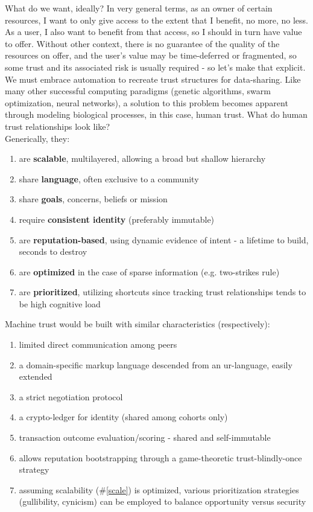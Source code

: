 \documentclass[10pt, twoside]{article}
\begin{document}
What do we want, ideally? In very general terms, as an owner of certain resources, I want to only give access to the extent that I benefit, no more, no less. As a user, I also want to benefit from that access, so I should in turn have value to offer. Without other context, there is no guarantee of the quality of the resources on offer, and the user's value may be time-deferred or fragmented, so some trust and its associated risk is usually required - so let's make that explicit. We must embrace automation to recreate trust structures for data-sharing. Like many other successful computing paradigms (genetic algorithms, swarm optimization, neural networks), a solution to this problem becomes apparent through modeling biological processes, in this case, human trust. What do human trust relationships look like? 
\\Generically, they:
\begin{enumerate}
	\item are \textbf{scalable}, multilayered, allowing a broad but shallow hierarchy \label{scale}
	\item share \textbf{language}, often exclusive to a community \label{language}
	\item share \textbf{goals}, concerns, beliefs or mission \label{mission}
	\item require \textbf{consistent identity} (preferably immutable) \label{identity}
	\item are \textbf{reputation-based}, using dynamic evidence of intent - a lifetime to build, seconds to destroy \label{reputation}
	\item are \textbf{optimized} in the case of sparse information (e.g. two-strikes rule) \label{optimized}
	\item are \textbf{prioritized}, utilizing shortcuts since tracking trust relationships tends to be high cognitive load \label{priorities}
\end{enumerate}
Machine trust would be built with similar characteristics (respectively):
\begin{enumerate}
	\item limited direct communication among peers
	\item a domain-specific markup language descended from an ur-language, easily extended
	\item a strict negotiation protocol
	\item a crypto-ledger for identity (shared among cohorts only)
	\item transaction outcome evaluation/scoring - shared and self-immutable
	\item allows reputation bootstrapping through a game-theoretic trust-blindly-once strategy
	\item assuming scalability (\#\ref{scale}) is optimized, various prioritization strategies (gullibility, cynicism) can be employed to balance opportunity versus security
\end{enumerate}
\end{document}
